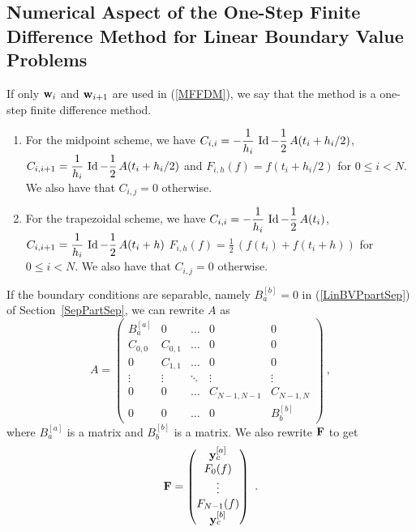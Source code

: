 \subsection{Numerical Aspect of the One-Step Finite Difference
Method for Linear Boundary Value Problems}

If only $\mathbf{w}_i$ and $\mathbf{w}_{i+1}$ are used in (\ref{MFFDM}), we
say that the method is a one-step finite difference method.

\begin{eggList}
\begin{enumerate}
\item For the midpoint scheme, we have
$\displaystyle C_{i,i} = -\frac{1}{h_i}\,\operatorname{Id} -\frac{1}{2}\,A(t_i+h_i/2)$,
$\displaystyle C_{i,i+1} = \frac{1}{h_i}\,\operatorname{Id} - \frac{1}{2}\,A(t_i+h_i/2)$
and $\displaystyle F_{i,h}(f) = f(t_i+h_i/2)$ for $0 \leq i < N$.
We also have that $C_{i,j} = 0$ otherwise.
\item For the trapezoidal scheme, we have
$\displaystyle C_{i,i} =  -\frac{1}{h_i}\,\operatorname{Id} -\frac{1}{2}\,A(t_i)$,
$\displaystyle C_{i,i+1} = \frac{1}{h_i}\,\operatorname{Id} -\frac{1}{2}\,A(t_i+h)$
$\displaystyle F_{i,h}(f) = \frac{1}{2}\,\left( f(t_i) + f(t_i+h) \right)$
for $0 \leq i < N$.  We also have that $C_{i,j} = 0$ otherwise.
\end{enumerate}
\end{eggList}

If the boundary conditions are separable, namely $B_a^{[b]}=0$ in
(\ref{LinBVPpartSep}) of Section~\ref{SepPartSep}, we can rewrite $A$ as
\begin{equation} \label{sepM}
A = \begin{pmatrix}
B_a^{[a]} & 0 & \ldots & 0 & 0 \\
C_{0,0} & C_{0,1} & \ldots & 0 & 0 \\
0 & C_{1,1} & \ldots & 0 & 0 \\
\vdots & \vdots & \ddots & \vdots & \vdots \\
0 & 0 & \ldots & C_{N-1,N-1} & C_{N-1,N} \\
0 & 0 & \ldots & 0 & B_b^{[b]}
\end{pmatrix} \ ,
\end{equation}
where $B_a^{[a]}$ is a  matrix and $B_b^{[b]}$ is a
 matrix.  We also rewrite $\mathbf{F}$ to get
\[
\mathbf{F} = \begin{pmatrix} \mathbf{y}_c^{[a]} \\ F_0(f) \\ \vdots \\
 F_{N-1}(f) \\ \mathbf{y}_c^{[b]} \end{pmatrix} \ .
\]

